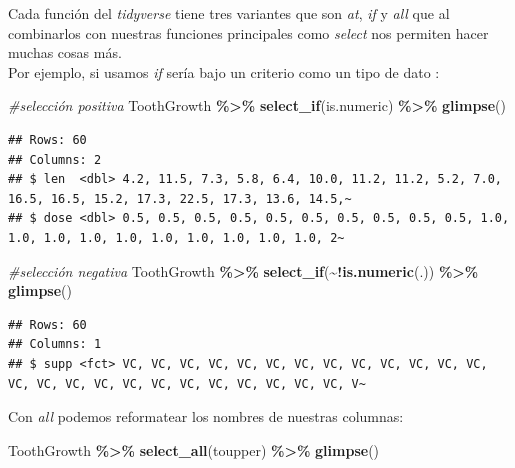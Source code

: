 \documentclass[
]{book}
\newenvironment{Shaded}{\begin{snugshade}}{\end{snugshade}}
\newcommand{\CommentTok}[1]{\textcolor[rgb]{0.56,0.35,0.01}{\textit{#1}}}
\newcommand{\FunctionTok}[1]{\textcolor[rgb]{0.13,0.29,0.53}{\textbf{#1}}}
\newcommand{\NormalTok}[1]{#1}
\newcommand{\SpecialCharTok}[1]{\textcolor[rgb]{0.81,0.36,0.00}{\textbf{#1}}}
\begin{document}
\hfill\break
Cada función del \emph{tidyverse} tiene tres variantes que son \emph{at}, \emph{if} y \emph{all} que al combinarlos con nuestras funciones principales como \emph{select} nos permiten hacer muchas cosas más.\\
Por ejemplo, si usamos \emph{if} sería bajo un criterio como un tipo de dato
:\\

\begin{Shaded}
\begin{Highlighting}[]
\CommentTok{\#selección positiva}
\NormalTok{ToothGrowth }\SpecialCharTok{\%\textgreater{}\%} \FunctionTok{select\_if}\NormalTok{(is.numeric) }\SpecialCharTok{\%\textgreater{}\%} \FunctionTok{glimpse}\NormalTok{()}
\end{Highlighting}
\end{Shaded}

\begin{verbatim}
## Rows: 60
## Columns: 2
## $ len  <dbl> 4.2, 11.5, 7.3, 5.8, 6.4, 10.0, 11.2, 11.2, 5.2, 7.0, 16.5, 16.5, 15.2, 17.3, 22.5, 17.3, 13.6, 14.5,~
## $ dose <dbl> 0.5, 0.5, 0.5, 0.5, 0.5, 0.5, 0.5, 0.5, 0.5, 0.5, 1.0, 1.0, 1.0, 1.0, 1.0, 1.0, 1.0, 1.0, 1.0, 1.0, 2~
\end{verbatim}

\begin{Shaded}
\begin{Highlighting}[]
\CommentTok{\#selección negativa}
\NormalTok{ToothGrowth }\SpecialCharTok{\%\textgreater{}\%} \FunctionTok{select\_if}\NormalTok{(}\SpecialCharTok{\textasciitilde{}!}\FunctionTok{is.numeric}\NormalTok{(.)) }\SpecialCharTok{\%\textgreater{}\%} \FunctionTok{glimpse}\NormalTok{()}
\end{Highlighting}
\end{Shaded}

\begin{verbatim}
## Rows: 60
## Columns: 1
## $ supp <fct> VC, VC, VC, VC, VC, VC, VC, VC, VC, VC, VC, VC, VC, VC, VC, VC, VC, VC, VC, VC, VC, VC, VC, VC, VC, V~
\end{verbatim}

\hfill\break
Con \emph{all} podemos reformatear los nombres de nuestras columnas:

\begin{Shaded}
\begin{Highlighting}[]
\NormalTok{ToothGrowth }\SpecialCharTok{\%\textgreater{}\%} \FunctionTok{select\_all}\NormalTok{(toupper) }\SpecialCharTok{\%\textgreater{}\%} \FunctionTok{glimpse}\NormalTok{()}
\end{Highlighting}
\end{Shaded}
\end{document}
